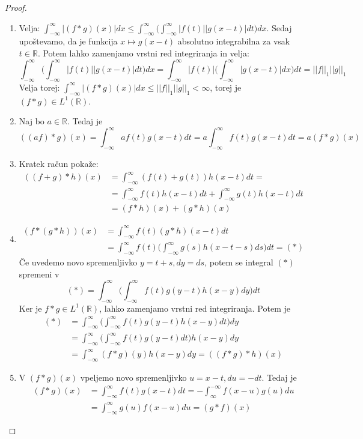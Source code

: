 \documentclass[a4paper, 10pt]{article}
\newcommand{\abs}[1]{\ensuremath{\lvert #1 \rvert}}
\newcommand{\mth}[1]{\ensuremath{\mathbb{#1}}}
\newcommand{\R}{\mth{R}}
\begin{document}
			\begin{proof}
				\begin{enumerate}
					\item Velja: $\int_{-\infty}^{\infty}\abs{(f*g)(x)}dx \leq \int_{-\infty}^{\infty}\big(\int_{-\infty}^{\infty}\abs{f(t)}\abs{g(x-t)}dt\big)dx$. Sedaj upoštevamo, da je funkcija $x\mapsto g(x-t)$ absolutno integrabilna za vsak $t\in\R$. Potem lahko zamenjamo vrstni red integriranja in velja: $$\int_{-\infty}^{\infty}\big(\int_{-\infty}^{\infty}\abs{f(t)}\abs{g(x-t)}dt\big)dx = \int_{-\infty}^{\infty}\abs{f(t)}\big(\int_{-\infty}^{\infty}\abs{g(x-t)}dx\big)dt = \abs{\abs{f}}_1\abs{\abs{g}}_1$$
					Velja torej: $\int_{-\infty}^{\infty}\abs{(f*g)(x)}dx \leq \abs{\abs{f}}_1\abs{\abs{g}}_1 < \infty$, torej je $(f*g)\in L^1(\R)$.
					\item Naj bo $a\in\R$. Tedaj je $$((af)*g)(x) = \int_{-\infty}^{\infty}af(t)g(x-t)dt = a\int_{-\infty}^{\infty}f(t)g(x-t)dt = a(f*g)(x)$$
					\item Kratek račun pokaže: \begin{align*}
						((f+g)*h)(x) &= \int_{-\infty}^{\infty}(f(t)+ g(t))h(x-t)dt = \\
						&= \int_{-\infty}^{\infty}f(t)h(x-t)dt + \int_{-\infty}^{\infty}g(t)h(x-t)dt \\
						&= (f*h)(x) + (g*h)(x)
					\end{align*}
					\item 
					\begin{align*}
						(f*(g*h))(x) &= \int_{-\infty}^{\infty}f(t)(g*h)(x-t)dt \\
						&= \int_{-\infty}^{\infty}f(t)\big(\int_{-\infty}^{\infty}g(s)h(x-t-s)ds\big)dt = (*)
					\end{align*}
					Če uvedemo novo spremenljivko $y = t+s, dy = ds$, potem se integral $(*)$ spremeni v $$
					(*) =\int_{-\infty}^{\infty}\big(\int_{-\infty}^{\infty}f(t)g(y-t)h(x-y)dy\big)dt
					$$
					Ker je $f*g \in L^1(\R)$, lahko zamenjamo vrstni red integriranja. Potem je \begin{align*} 
					(*) &= \int_{-\infty}^{\infty}\big(\int_{-\infty}^{\infty}f(t)g(y-t)h(x-y)dt\big)dy \\
					&= \int_{-\infty}^{\infty}\big(\int_{-\infty}^{\infty}f(t)g(y-t)dt\big)h(x-y)dy \\
					&= \int_{-\infty}^{\infty}(f*g)(y)h(x-y)dy = ((f*g)*h)(x)
					\end{align*}
					\item V $(f*g)(x)$ vpeljemo novo spremenljivko $u = x-t, du = -dt$. Tedaj je \begin{align*}
						(f*g)(x) &= \int_{-\infty}^{\infty}f(t)g(x-t)dt = -\int_{\infty}^{-\infty}f(x-u)g(u)du \\
						&=\int_{-\infty}^{\infty}g(u)f(x-u)du = (g*f)(x)
					\end{align*}
				\end{enumerate}
			\end{proof}
			
\end{document}
